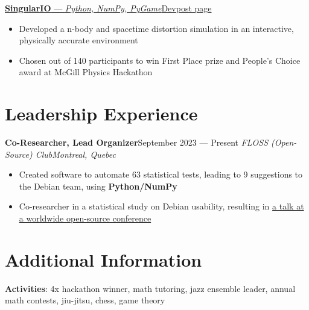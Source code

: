 \documentclass{article}
\newcommand{\newrole}[4]{
    {\normalfont\textbf{#1}\hfill#3}
    \newline
    \textit{#2}\hfill\textit{#4}
}
\newcommand{\shortlinkrole}[4]{
    {\href{#3}{\normalfont\textbf{#1} --- \textit{#2}\hfill#4\:\faExternalLink}\vspace*{-4pt}}
}
\newenvironment{bulletpoints}{\begin{itemize}\setlength\itemsep{-0.2em}}{\end{itemize}}
\begin{document}
\shortlinkrole{SingularIO}{Python, NumPy, PyGame}{https://devpost.com/software/singulario}{Devpost page}
\begin{bulletpoints}
    \item Developed a n-body and spacetime distortion simulation in an interactive, physically accurate environment
    \item Chosen out of 140 participants to win First Place prize and People's Choice award at McGill Physics Hackathon
\end{bulletpoints}


\section*{Leadership Experience}
\newrole{Co-Researcher, Lead Organizer}{FLOSS (Open-Source) Club}{September 2023 --- Present}{Montreal, Quebec}
\begin{bulletpoints}
    \item Created software to automate 63 statistical tests, leading to 9 suggestions to the Debian team, using \textbf{Python/NumPy}
    \item Co-researcher in a statistical study on Debian usability, resulting in \href{https://debconf24.debconf.org/talks/49-debian-installer-usability-tests-take-2/}{a talk at a worldwide open-source conference\;\faExternalLink}
\end{bulletpoints}


\section*{Additional Information}
{\bfseries Activities}: 4x hackathon winner, math tutoring, jazz ensemble leader, annual math contests, jiu-jitsu, chess, game theory
\end{document}
